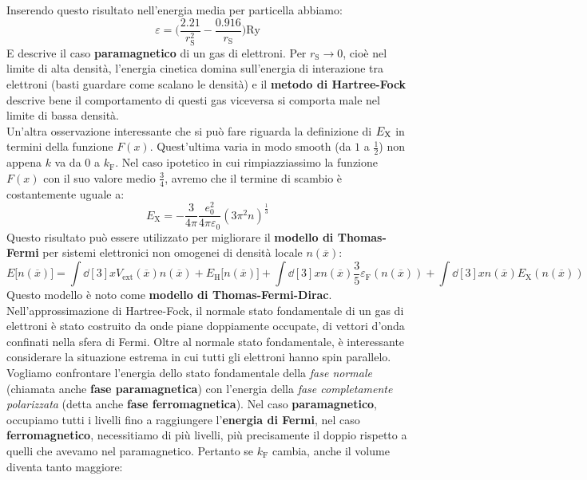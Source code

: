 Inserendo questo risultato nell'energia media per particella abbiamo:
\begin{equation*}
    \varepsilon=\bigg(\frac{2.21}{r_\text{S}^2}-\frac{0.916}{r_\text{S}}\bigg)\text{Ry}
\end{equation*}
E descrive il caso \textbf{paramagnetico} di un gas di elettroni.
Per $r_\text{S}\rightarrow 0$, cioè nel limite di alta densità, l'energia cinetica domina sull'energia di interazione tra elettroni (basti guardare come scalano le densità) e il \textbf{metodo di Hartree-Fock} descrive bene il comportamento di questi gas viceversa si comporta male nel limite di bassa densità.\\
Un'altra osservazione interessante che si può fare riguarda la definizione di $E_{\text X}$ in termini della funzione $F(x)$. Quest'ultima varia in modo smooth (da $1$ a $\frac 12$) non appena $k$ va da $0$ a $k_\text{F}$. Nel caso ipotetico in cui rimpiazziassimo la funzione $F(x)$ con il suo valore medio $\frac 34$, avremo che il termine di scambio è costantemente uguale a:
\begin{equation*}
    E_\text{X}=-\frac 3{4\pi}\frac{e_0^2}{4\pi\varepsilon_0}(3\pi^2n)^{\frac 13}
\end{equation*}
Questo risultato può essere utilizzato per migliorare il \textbf{modello di Thomas-Fermi} per sistemi elettronici non omogenei di densità locale $n(\overline x)$:
\begin{equation*}
    E\big[n(\overline x)\big]=\int \dd[3]{x}V_{\text{ext}}(\overline x)n(\overline x)+E_\text{H}\big[n(\overline x)\big]+\int \dd[3]x n(\overline x)\frac 35\varepsilon_\text{F}(n(\overline x))+\int \dd[3]xn(\overline x)E_\text{X}(n(\overline x)) 
\end{equation*}
Questo modello è noto come \textbf{modello di Thomas-Fermi-Dirac}.\newline
Nell'approssimazione di Hartree-Fock, il normale stato fondamentale di un gas di elettroni è stato costruito da onde piane doppiamente occupate, di vettori d'onda confinati nella sfera di Fermi. Oltre al normale stato fondamentale, è interessante considerare la situazione estrema in cui tutti gli elettroni hanno spin parallelo. Vogliamo confrontare l'energia dello stato fondamentale della \textit{fase normale} (chiamata anche \textbf{fase paramagnetica}) con l'energia della \textit{fase completamente polarizzata} (detta anche \textbf{fase ferromagnetica}). Nel caso \textbf{paramagnetico}, occupiamo tutti i livelli fino a raggiungere l'\textbf{energia di Fermi}, nel caso \textbf{ferromagnetico}, necessitiamo di più livelli, più precisamente il doppio rispetto a quelli che avevamo nel paramagnetico. Pertanto se $k_\text{F}$ cambia, anche il volume diventa tanto maggiore:
